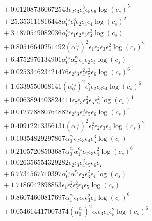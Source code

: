 \documentclass[10pt]{article}
\begin{document}
\begin{align*}
&{}  + 0.012087360672543 \epsilon_{2} \epsilon_{3} \epsilon_{4}^{3} \epsilon_{5} \epsilon_{6} \log{\left(c_{s} \right)}^{5} \\
&{}  + 25.353111816448 \alpha_{0}^{c_s} \epsilon_{1}^{3} \epsilon_{2} \epsilon_{3} \epsilon_{4} \log{\left(c_{s} \right)}^{2} \\
&{}  + 3.1870549082036 \alpha_{0}^{c_s} \epsilon_{1} \epsilon_{2} \epsilon_{3} \epsilon_{4}^{3} \log{\left(c_{s} \right)} \\
&{}  + 0.80516640251492 \left(\alpha_{0}^{c_s}\right)^{2} \epsilon_{1} \epsilon_{2} \epsilon_{3} \epsilon_{4}^{2} \log{\left(c_{s} \right)}^{2} \\
&{}  + 6.4752976134901 \alpha_{0}^{c_s} \alpha_{2}^{c_s} \epsilon_{1} \epsilon_{2} \epsilon_{3} \log{\left(c_{s} \right)} \\
&{}  + 0.025334623421476 \epsilon_{2} \epsilon_{3} \epsilon_{4}^{2} \epsilon_{5}^{2} \epsilon_{6} \log{\left(c_{s} \right)}^{6} \\
&{}  + 1.6339550068141 \left(\alpha_{0}^{c_s}\right)^{2} \epsilon_{1}^{2} \epsilon_{2} \epsilon_{3} \epsilon_{4} \log{\left(c_{s} \right)}^{6} \\
&{}  + 0.0063894403824411 \epsilon_{2} \epsilon_{3} \epsilon_{4}^{2} \epsilon_{5} \epsilon_{6}^{2} \log{\left(c_{s} \right)}^{4} \\
&{}  + 0.012778880764882 \epsilon_{2} \epsilon_{3} \epsilon_{4}^{3} \epsilon_{5} \epsilon_{6} \log{\left(c_{s} \right)}^{4} \\
&{}  + 0.40912213356131 \left(\alpha_{0}^{c_s}\right)^{2} \epsilon_{1}^{2} \epsilon_{2} \epsilon_{3} \epsilon_{4} \log{\left(c_{s} \right)}^{2} \\
&{}  + 0.10354829297867 \alpha_{0}^{c_s} \epsilon_{2} \epsilon_{3} \epsilon_{4} \epsilon_{5}^{3} \log{\left(c_{s} \right)} \\
&{}  + 0.21057208503687 \alpha_{0}^{c_s} \alpha_{1}^{c_s} \epsilon_{2} \epsilon_{3} \epsilon_{4}^{2} \log{\left(c_{s} \right)}^{6} \\
&{}  + 0.026356554329282 \epsilon_{2} \epsilon_{3} \epsilon_{4}^{2} \epsilon_{5} \epsilon_{6} \epsilon_{7} \\
&{}  + 6.7734567710397 \alpha_{0}^{c_s} \alpha_{1}^{c_s} \epsilon_{2} \epsilon_{3}^{2} \epsilon_{4} \log{\left(c_{s} \right)} \\
&{}  + 1.7186042898853 \epsilon_{1} \epsilon_{2}^{2} \epsilon_{3}^{2} \epsilon_{4} \epsilon_{5} \log{\left(c_{s} \right)} \\
&{}  + 0.86074600817697 \alpha_{1}^{c_s} \epsilon_{1} \epsilon_{2} \epsilon_{3}^{2} \epsilon_{4} \log{\left(c_{s} \right)}^{6} \\
&{}  + 0.054614417007374 \left(\alpha_{0}^{c_s}\right)^{2} \epsilon_{2} \epsilon_{3} \epsilon_{4} \epsilon_{5}^{2} \log{\left(c_{s} \right)}^{6}
\end{align*}
\end{document}
